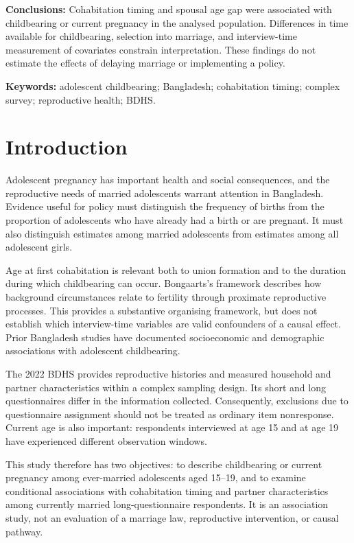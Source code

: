 \documentclass[11pt]{article}
\begin{document}
\textbf{Conclusions:} Cohabitation timing and spousal age gap were associated with childbearing or current pregnancy in the analysed population. Differences in time available for childbearing, selection into marriage, and interview-time measurement of covariates constrain interpretation. These findings do not estimate the effects of delaying marriage or implementing a policy.

\textbf{Keywords:} adolescent childbearing; Bangladesh; cohabitation timing; complex survey; reproductive health; BDHS.

\section{Introduction}
Adolescent pregnancy has important health and social consequences, and the reproductive needs of married adolescents warrant attention in Bangladesh.\cite{who,bdhs} Evidence useful for policy must distinguish the frequency of births from the proportion of adolescents who have already had a birth or are pregnant. It must also distinguish estimates among married adolescents from estimates among all adolescent girls.

Age at first cohabitation is relevant both to union formation and to the duration during which childbearing can occur. Bongaarts's framework describes how background circumstances relate to fertility through proximate reproductive processes.\cite{bongaarts} This provides a substantive organising framework, but does not establish which interview-time variables are valid confounders of a causal effect. Prior Bangladesh studies have documented socioeconomic and demographic associations with adolescent childbearing.\cite{alam,islam}

The 2022 BDHS provides reproductive histories and measured household and partner characteristics within a complex sampling design. Its short and long questionnaires differ in the information collected.\cite{bdhs} Consequently, exclusions due to questionnaire assignment should not be treated as ordinary item nonresponse. Current age is also important: respondents interviewed at age 15 and at age 19 have experienced different observation windows.

This study therefore has two objectives: to describe childbearing or current pregnancy among ever-married adolescents aged 15--19, and to examine conditional associations with cohabitation timing and partner characteristics among currently married long-questionnaire respondents. It is an association study, not an evaluation of a marriage law, reproductive intervention, or causal pathway.
\end{document}
